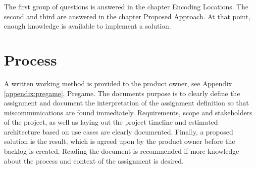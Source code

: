 The first group of questions is answered in the chapter Encoding Locations. The second and third are answered in the chapter Proposed Approach. At that point, enough knowledge is available to implement a solution.

%
\section{Process}

A written working method is provided to the product owner, see Appendix \ref{appendix:pregame}, Pregame. The documents purpose is to clearly define the assignment and document the interpretation of the assignment definition so that miscommunications are found immediately. Requirements, scope and stakeholders of the project, as well as laying out the project timeline and estimated architecture based on use cases are clearly documented. Finally, a proposed solution is the result, which is agreed upon by the product owner before the backlog is created. Reading the document is recommended if more knowledge about the process and context of the assignment is desired.
